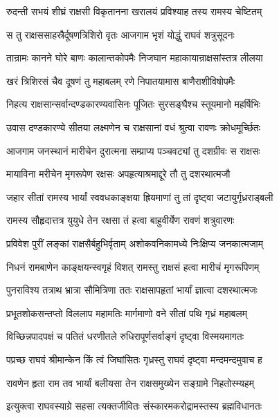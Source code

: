 \twolineshloka
{रुदन्ती सभयं शीघ्रं राक्षसी विकृतानना}
{खरालयं प्रविश्याह तस्य रामस्य चेष्टितम्}%

\twolineshloka
{स तु राक्षससाहस्रैर्दूषणत्रिशिरो वृतः}
{आजगाम भृशं योद्धुं राघवं शत्रुसूदनः}%

\twolineshloka
{तान्रामः कानने घोरे बाणः कालान्तकोपमैः}
{निजघान महाकायान्राक्षसांस्तत्र लीलया}%

\twolineshloka
{खरं त्रिशिरसं चैव दूषणं तु महाबलम्}
{रणे निपातयामास बाणैराशीविषोपमैः}%

\twolineshloka
{निहत्य राक्षसान्सर्वान्दण्डकारण्यवासिनः}
{पूजितः सुरसङ्घैश्च स्तूयमानो महर्षिभिः}%

\twolineshloka
{उवास दण्डकारण्ये सीतया लक्ष्मणेन च}
{राक्षसानां वधं श्रुत्वा रावणः क्रोधमूर्च्छितः}%

\twolineshloka
{आजगाम जनस्थानं मारीचेन दुरात्मना}
{सम्प्राप्य पञ्चवट्यां तु दशग्रीवः स राक्षसः}%

\twolineshloka
{मायाविना मरीचेन मृगरूपेण रक्षसः}
{अपहृत्याश्रमाद्दूरे तौ तु दशरथात्मजौ}%

\twolineshloka
{जहार सीतां रामस्य भार्यां स्ववधकाङ्क्षया}
{ह्रियमाणां तु तां दृष्ट्वा जटायुर्गृध्रराड्बली}%

\twolineshloka
{रामस्य सौहृदात्तत्र युयुधे तेन रक्षसा}
{तं हत्वा बाहुवीर्येण रावणं शत्रुवारणः}%

\twolineshloka
{प्रविवेश पुरीं लङ्कां राक्षसैर्बहुभिर्वृताम्}
{अशोकवनिकामध्ये निःक्षिप्य जनकात्मजाम्}%

\twolineshloka
{निधनं रामबाणेन काङ्क्षयन्स्वगृहं विशत्}
{रामस्तु राक्षसं हत्वा मारीचं मृगरूपिणम्}%

\twolineshloka
{पुनराविश्य तत्राथ भ्रात्रा सौमित्रिणा ततः}
{राक्षसापहृतां भार्यां ज्ञात्वा दशरथात्मजः}%

\twolineshloka
{प्रभूतशोकसन्तप्तो विललाप महामतिः}
{मार्गमाणो वने सीतां पथि गृध्रं महाबलम्}%

\twolineshloka
{विच्छिन्नपादपक्षं च पतितं धरणीतले}
{रुधिरापूर्णसर्वाङ्गं दृष्ट्वा विस्मयमागतः}%

\twolineshloka
{पप्रच्छ राघवं श्रीमान्केन किं त्वं जिघांसितः}
{गृध्रस्तु राघवं दृष्ट्वा मन्दमन्दमुवाच ह}%


\twolineshloka
{रावणेन हृता राम तव भार्यां बलीयसा}
{तेन राक्षसमुख्येन सङ्ग्रामे निहतोस्म्यहम्}%


\twolineshloka
{इत्युक्त्वा राघवस्याग्रे सहसा त्यक्तजीवितः}
{संस्कारमकरोद्रामस्तस्य ब्रह्मविधानतः}%

